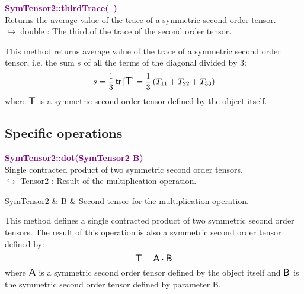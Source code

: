 \textcolor{purple}{\textbf{SymTensor2::thirdTrace(~)}}\label{SymTensor2::thirdTrace()}\\
Returns the average value of the trace of a symmetric second order tensor.\\ \hspace*{10mm}$\hookrightarrow$ double : The third of the trace of the second order tensor.

This method returns average value of the trace of a symmetric second order tensor, i.e. the sum $s$ of all the terms of the diagonal divided by 3:
\begin{equation*}
s = \frac{1}{3} \mbox{\ensuremath{\mathsf{\,tr\,}}}[\mbox{\large\ensuremath{\mathsf{T}}}] =  \frac{1}{3} \left( T_{11}+T_{22}+T_{33} \right)
\end{equation*}
where $\mbox{\large\ensuremath{\mathsf{T}}}$ is a symmetric second order tensor defined by the object itself.

\subsection{Specific operations}

\textcolor{purple}{\textbf{SymTensor2::dot(SymTensor2 B)}}\label{SymTensor2::dot(SymTensor2 B)}\\
Single contracted product of two symmetric second order tensors.\\ \hspace*{10mm}$\hookrightarrow$ Tensor2 : Result of the multiplication operation.

\begin{tcolorbox}[width=\textwidth,myArgs,tabularx={ll|R}]
SymTensor2 & B & Second tensor for the multiplication operation.
\end{tcolorbox}

This method defines a single contracted product of two symmetric second order tensors.
The result of this operation is also a symmetric second order tensor defined by:
\begin{equation*}
\mbox{\large\ensuremath{\mathsf{T}}} = \mbox{\large\ensuremath{\mathsf{A}}} \cdot \mbox{\large\ensuremath{\mathsf{B}}}
\end{equation*}
where $\mbox{\large\ensuremath{\mathsf{A}}}$ is a symmetric second order tensor defined by the object itself and $\mbox{\large\ensuremath{\mathsf{B}}}$ is the symmetric second order tensor defined by parameter B.

